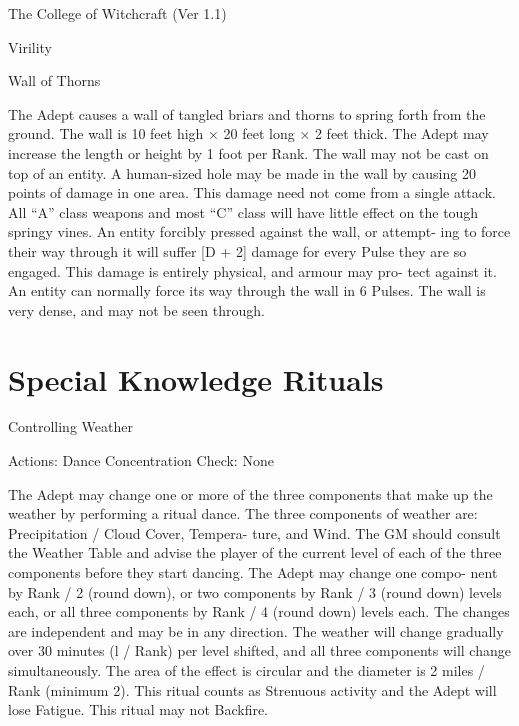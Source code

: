 \begin{Chapter}{The College of Witchcraft (Ver 1.1)}
\begin{spell}[S-18]{Virility }
\begin{effects}
\end{effects}
\end{spell}

\begin{spell}[S-19]{Wall of Thorns }

\begin{effects}
 The  Adept  causes  a  wall  of  tangled  briars 
and  thorns  to  spring  forth  from  the  ground.  The 
wall  is  10  feet  high  ×  20  feet  long  ×  2  feet  thick. 
The  Adept  may  increase  the  length  or  height by  1 
foot per Rank. The wall may not be cast on top of 
an entity. A human-sized hole may be made in the 
wall  by  causing  20  points  of  damage  in  one  area. 
This  damage  need  not  come  from  a  single  attack. 
All  “A”  class  weapons  and  most  “C”  class  will 
have  little  effect  on  the  tough  springy  vines.  An 
entity forcibly pressed against the wall, or attempt-
ing to force their way through it will suffer [D + 2] 
damage  for  every  Pulse  they  are  so  engaged.  This 
damage  is  entirely  physical,  and  armour  may  pro-
tect against it. An entity can normally force its way 
through  the  wall  in  6  Pulses.  The  wall  is  very 
dense, and may not be seen through. 


\end{effects}
\end{spell}

\section{Special Knowledge Rituals}

\begin{ritual}[R-1]{Controlling Weather }

Actions: Dance 
Concentration Check: None 
\begin{effects}
The Adept may change one or more of the 
three  components  that  make  up  the  weather  by 
performing a ritual dance. The three components of 
weather are: Precipitation / Cloud Cover, Tempera-
ture,  and  Wind.  The  GM  should  consult  the 
Weather Table and advise the player of the current 
level  of  each  of  the  three  components  before  they 
start  dancing.  The  Adept  may  change  one  compo-
nent by Rank / 2 (round down), or two components 
by Rank / 3 (round down) levels each, or all three 
components by Rank / 4 (round down) levels each. 
The  changes  are  independent  and  may  be  in  any 
direction.  The  weather  will  change  gradually  over 
30 minutes (l / Rank) per level shifted, and all three 
components  will  change  simultaneously.  The  area 
of the effect is circular and the diameter is 2 miles / 
Rank (minimum 2). This ritual counts as Strenuous 
activity and the Adept will lose Fatigue. This ritual 
may not Backfire. 


\end{effects}
\end{ritual}
\end{Chapter}
